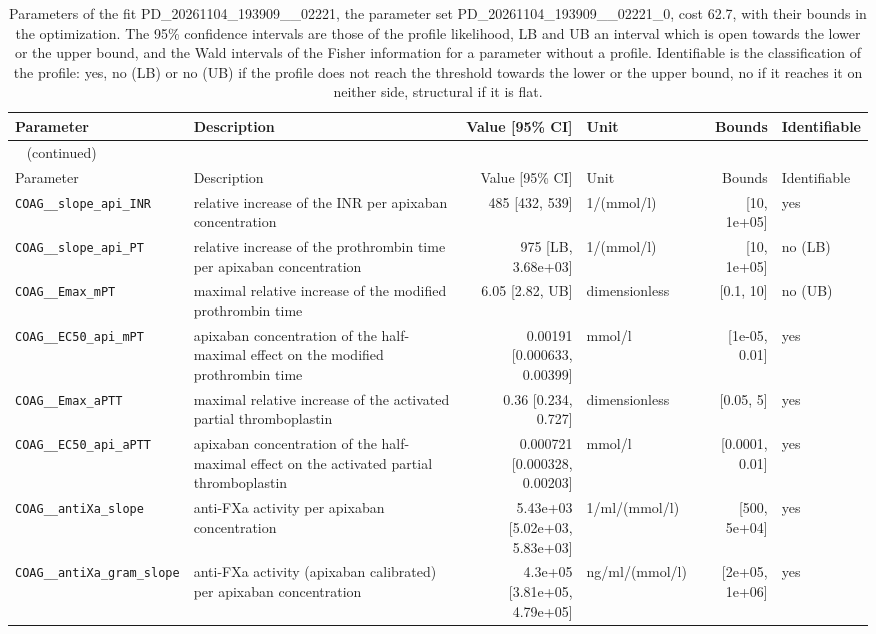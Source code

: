 \begin{longtable}{llrlrl}
\caption{Parameters of the fit PD\_20261104\_193909\_\_02221, the parameter set PD\_20261104\_193909\_\_02221\_0, cost 62.7, with their bounds in the optimization. The 95\% confidence intervals are those of the profile likelihood, LB and UB an interval which is open towards the lower or the upper bound, and the Wald intervals of the Fisher information for a parameter without a profile. Identifiable is the classification of the profile: yes, no (LB) or no (UB) if the profile does not reach the threshold towards the lower or the upper bound, no if it reaches it on neither side, structural if it is flat.}\label{tab:parameters:PD_20261104_193909__02221} \\
\toprule
Parameter & Description & Value [95\% CI] & Unit & Bounds & Identifiable \\
\midrule
\endfirsthead
\multicolumn{6}{l}{\small\tablename~\thetable{} (continued)} \\
\toprule
Parameter & Description & Value [95\% CI] & Unit & Bounds & Identifiable \\
\midrule
\endhead
\bottomrule
\endlastfoot
\texttt{COAG\_\_slope\_api\_INR} & relative increase of the INR per apixaban concentration & 485 [432, 539] & 1/(mmol/l) & [10, 1e+05] & yes \\
\texttt{COAG\_\_slope\_api\_PT} & relative increase of the prothrombin time per apixaban concentration & 975 [LB, 3.68e+03] & 1/(mmol/l) & [10, 1e+05] & no (LB) \\
\texttt{COAG\_\_Emax\_mPT} & maximal relative increase of the modified prothrombin time & 6.05 [2.82, UB] & dimensionless & [0.1, 10] & no (UB) \\
\texttt{COAG\_\_EC50\_api\_mPT} & apixaban concentration of the half-maximal effect on the modified prothrombin time & 0.00191 [0.000633, 0.00399] & mmol/l & [1e-05, 0.01] & yes \\
\texttt{COAG\_\_Emax\_aPTT} & maximal relative increase of the activated partial thromboplastin & 0.36 [0.234, 0.727] & dimensionless & [0.05, 5] & yes \\
\texttt{COAG\_\_EC50\_api\_aPTT} & apixaban concentration of the half-maximal effect on the activated partial thromboplastin & 0.000721 [0.000328, 0.00203] & mmol/l & [0.0001, 0.01] & yes \\
\texttt{COAG\_\_antiXa\_slope} & anti-FXa activity per apixaban concentration & 5.43e+03 [5.02e+03, 5.83e+03] & 1/ml/(mmol/l) & [500, 5e+04] & yes \\
\texttt{COAG\_\_antiXa\_gram\_slope} & anti-FXa activity (apixaban calibrated) per apixaban concentration & 4.3e+05 [3.81e+05, 4.79e+05] & ng/ml/(mmol/l) & [2e+05, 1e+06] & yes \\
\end{longtable}

